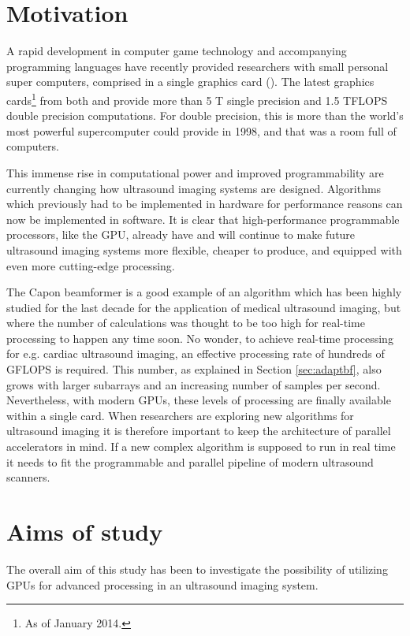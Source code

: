 \section{Motivation}
A rapid development in computer game technology and accompanying programming languages have recently provided researchers with small personal super computers, comprised in a single graphics card (). The latest graphics cards\footnote{As of January 2014.} from both  and  provide more than 5 T single precision and 1.5 TFLOPS double precision computations. For double precision, this is more than the world's most powerful supercomputer could provide in 1998, and that was a room full of computers.

This immense rise in computational power and improved programmability are currently changing how ultrasound imaging systems are designed. Algorithms which previously had to be implemented in hardware for performance reasons can now be implemented in software. 
It is clear that high-performance programmable processors, like the GPU, already have and will continue to make future ultrasound imaging systems more flexible, cheaper to produce, and equipped with even more cutting-edge processing.

The Capon beamformer  is a good example of an algorithm which has been highly studied for the last decade for the application of medical ultrasound imaging, but where the number of calculations was thought to be too high for real-time processing to happen any time soon. No wonder, to achieve real-time processing for e.g. cardiac ultrasound imaging, an effective processing rate of hundreds of GFLOPS is required. This number, as explained in Section \ref{sec:adaptbf}, also grows with larger subarrays and an increasing number of samples per second. Nevertheless, with modern GPUs, these levels of processing are finally available within a single card. When researchers are exploring new algorithms for ultrasound imaging it is therefore important to keep the architecture of parallel accelerators in mind. If a new complex algorithm is supposed to run in real time it needs to fit the programmable and parallel pipeline of modern ultrasound scanners.

\section{Aims of study}
The overall aim of this study has been to investigate the possibility of utilizing GPUs for advanced processing in an ultrasound imaging system. 

